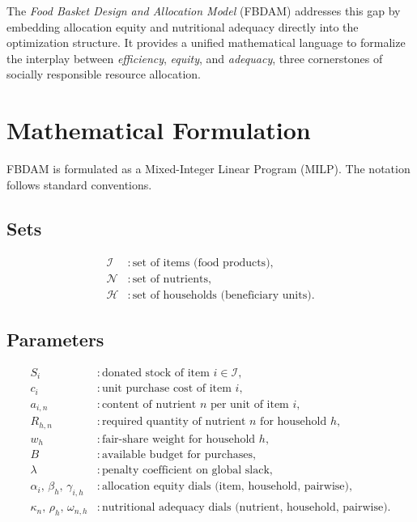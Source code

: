 \documentclass[preprint,12pt]{elsarticle}
\begin{document}
The \emph{Food Basket Design and Allocation Model} (FBDAM) addresses this gap by embedding allocation equity and nutritional adequacy directly into the optimization structure. It provides a unified mathematical language to formalize the interplay between \emph{efficiency}, \emph{equity}, and \emph{adequacy}, three cornerstones of socially responsible resource allocation.

\section{Mathematical Formulation}
\label{sec:model}
FBDAM is formulated as a Mixed-Integer Linear Program (MILP). The notation follows standard conventions.

\subsection{Sets}
\begin{align*}
\mathcal{I} &: \text{set of items (food products)},\\
\mathcal{N} &: \text{set of nutrients},\\
\mathcal{H} &: \text{set of households (beneficiary units)}.
\end{align*}

\subsection{Parameters}
\begin{align*}
S_i & : \text{donated stock of item } i \in \mathcal{I},\\
c_i & : \text{unit purchase cost of item } i,\\
a_{i,n} & : \text{content of nutrient } n \text{ per unit of item } i,\\
R_{h,n} & : \text{required quantity of nutrient } n \text{ for household } h,\\
w_h & : \text{fair-share weight for household } h,\\
B & : \text{available budget for purchases},\\
\lambda & : \text{penalty coefficient on global slack},\\
\alpha_i,\, \beta_h,\, \gamma_{i,h} & : \text{allocation equity dials (item, household, pairwise)},\\
\kappa_n,\, \rho_h, \, \omega_{n,h} & : \text{nutritional adequacy dials (nutrient, household, pairwise)}.
\end{align*}
\end{document}
